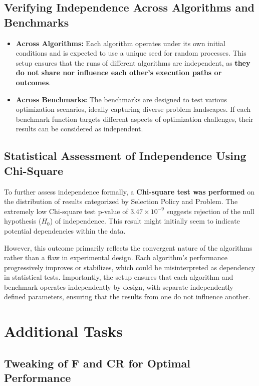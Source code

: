 \documentclass[12pt,a4paper]{article}
\begin{document}
\subsection{Verifying Independence Across Algorithms and Benchmarks}
\begin{itemize}
    \item \textbf{Across Algorithms:} Each algorithm operates under its own initial conditions and is expected  to use a unique seed for random processes. This setup ensures that the runs of different algorithms are independent, as \textbf{they do not share nor influence each other’s execution paths or outcomes}.
    
    \item \textbf{Across Benchmarks:} The benchmarks are designed to test various optimization scenarios, ideally capturing diverse problem landscapes. If each benchmark function targets different aspects of optimization challenges, their results can be considered as independent.
\end{itemize}

\subsection{Statistical Assessment of Independence Using Chi-Square}
To further assess independence formally, a \textbf{Chi-square test was performed} on the distribution of results categorized by Selection Policy and Problem. The extremely low Chi-square test p-value of \(3.47 \times 10^{-9}\) suggests rejection of the null hypothesis (\(H_0\)) of independence. This result might initially seem to indicate potential dependencies within the data.

However, this outcome primarily reflects the convergent nature of the algorithms rather than a flaw in experimental design. Each algorithm's performance progressively improves or stabilizes, which could be misinterpreted as dependency in statistical tests. Importantly, the setup ensures that each algorithm and benchmark operates independently by design, with separate independently defined parameters, ensuring that the results from one do not influence another.

\section{Additional Tasks}
\subsection{Tweaking of F and CR for Optimal Performance}
\end{document}
